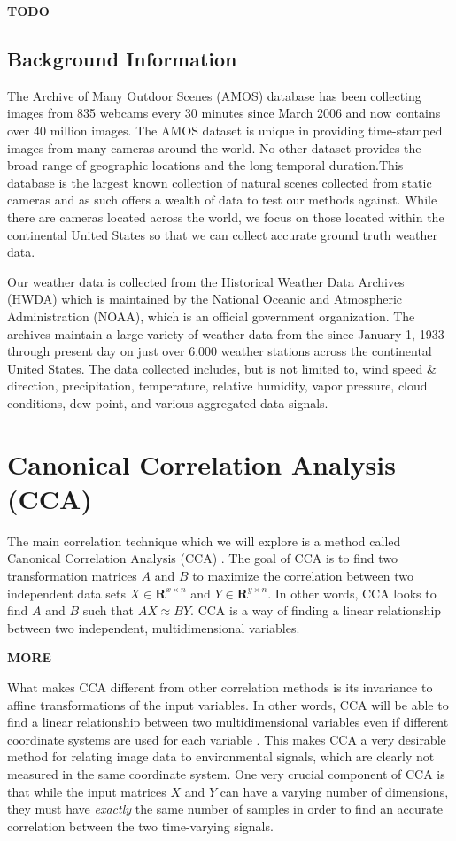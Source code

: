 \textbf{TODO}

\section{Background Information}
The Archive of Many Outdoor Scenes (AMOS) database \cite{jacobs07amos} has been collecting images from 835 webcams every 30 minutes since March 2006 and now contains over 40 million images. The AMOS dataset is unique in providing time-stamped images from many cameras around the world. No other dataset provides the broad range of geographic locations and the long temporal duration.This database is the largest known collection of natural scenes collected from static cameras and as such offers a wealth of data to test our methods against. While there are cameras located across the world, we focus on those located within the continental United States so that we can collect accurate ground truth weather data.

Our weather data is collected from the Historical Weather Data Archives (HWDA) \cite{noaa} which is maintained by the National Oceanic and Atmospheric Administration (NOAA), which is an official government organization. The archives maintain a large variety of weather data from the since January 1, 1933 through present day on just over 6,000 weather stations across the continental United States. The data collected includes, but is not limited to, wind speed \& direction, precipitation, temperature, relative humidity, vapor pressure, cloud conditions, dew point, and various aggregated data signals.

\chapter{Canonical Correlation Analysis (CCA)}
\label{cpt:cca}
The main correlation technique which we will explore is a method called Canonical Correlation Analysis (CCA) \cite{hotelling}. The goal of CCA is to find two transformation matrices $A$ and $B$ to maximize the correlation between two independent data sets $X \in \mathbf{R}^{x\times n}$ and $Y \in \mathbf{R}^{y\times n}$. In other words, CCA looks to find $A$ and $B$ such that $AX\approx BY$. CCA is a way of finding a linear relationship between two independent, multidimensional variables.

\textbf{MORE}

What makes CCA different from other correlation methods is its invariance to affine transformations of the input variables. In other words, CCA will be able to find a linear relationship between two multidimensional variables even if different coordinate systems are used for each variable \cite{bkl97}. This makes CCA a very desirable method for relating image data to environmental signals, which are clearly not measured in the same coordinate system. One very crucial component of CCA is that while the input matrices $X$ and $Y$ can have a varying number of dimensions, they must have \textit{exactly} the same number of samples in order to find an accurate correlation between the two time-varying signals.

